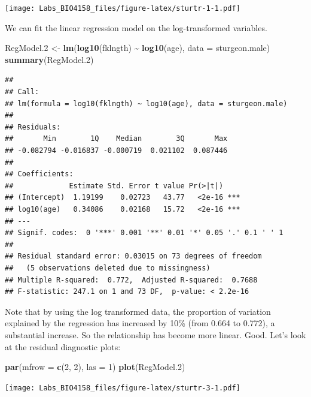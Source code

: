 \documentclass[
  12pt,
]{book}
\newenvironment{Shaded}{\begin{snugshade}}{\end{snugshade}}
\newcommand{\DataTypeTok}[1]{\textcolor[rgb]{0.13,0.29,0.53}{#1}}
\newcommand{\DecValTok}[1]{\textcolor[rgb]{0.00,0.00,0.81}{#1}}
\newcommand{\FloatTok}[1]{\textcolor[rgb]{0.00,0.00,0.81}{#1}}
\newcommand{\KeywordTok}[1]{\textcolor[rgb]{0.13,0.29,0.53}{\textbf{#1}}}
\newcommand{\NormalTok}[1]{#1}
\newcommand{\OperatorTok}[1]{\textcolor[rgb]{0.81,0.36,0.00}{\textbf{#1}}}
\newcommand{\StringTok}[1]{\textcolor[rgb]{0.31,0.60,0.02}{#1}}
\begin{document}
\texttt{[image: Labs\_BIO4158\_files/figure-latex/sturtr-1-1.pdf]}

We can fit the linear regression model on the log-transformed variables.

\begin{Shaded}
\begin{Highlighting}[]
\NormalTok{RegModel}\FloatTok{.2}\NormalTok{ \textless{}{-}}\StringTok{ }\KeywordTok{lm}\NormalTok{(}\KeywordTok{log10}\NormalTok{(fklngth) }\OperatorTok{\textasciitilde{}}\StringTok{ }\KeywordTok{log10}\NormalTok{(age), }\DataTypeTok{data =}\NormalTok{ sturgeon.male)}
\KeywordTok{summary}\NormalTok{(RegModel}\FloatTok{.2}\NormalTok{)}
\end{Highlighting}
\end{Shaded}

\begin{verbatim}
## 
## Call:
## lm(formula = log10(fklngth) ~ log10(age), data = sturgeon.male)
## 
## Residuals:
##       Min        1Q    Median        3Q       Max 
## -0.082794 -0.016837 -0.000719  0.021102  0.087446 
## 
## Coefficients:
##             Estimate Std. Error t value Pr(>|t|)    
## (Intercept)  1.19199    0.02723   43.77   <2e-16 ***
## log10(age)   0.34086    0.02168   15.72   <2e-16 ***
## ---
## Signif. codes:  0 '***' 0.001 '**' 0.01 '*' 0.05 '.' 0.1 ' ' 1
## 
## Residual standard error: 0.03015 on 73 degrees of freedom
##   (5 observations deleted due to missingness)
## Multiple R-squared:  0.772,  Adjusted R-squared:  0.7688 
## F-statistic: 247.1 on 1 and 73 DF,  p-value: < 2.2e-16
\end{verbatim}

Note that by using the log transformed data, the proportion of variation explained by the regression has increased by 10\% (from 0.664 to 0.772), a substantial increase. So the relationship has become more linear. Good. Let's look at the residual diagnostic plots:

\begin{Shaded}
\begin{Highlighting}[]
\KeywordTok{par}\NormalTok{(}\DataTypeTok{mfrow =} \KeywordTok{c}\NormalTok{(}\DecValTok{2}\NormalTok{, }\DecValTok{2}\NormalTok{), }\DataTypeTok{las =} \DecValTok{1}\NormalTok{)}
\KeywordTok{plot}\NormalTok{(RegModel}\FloatTok{.2}\NormalTok{)}
\end{Highlighting}
\end{Shaded}

\texttt{[image: Labs\_BIO4158\_files/figure-latex/sturtr-3-1.pdf]}
\end{document}
